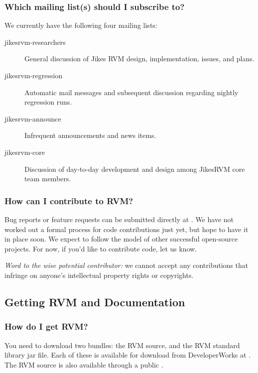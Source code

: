 \subsubsection{Which mailing list(s) should I subscribe to?}

We currently have the following four mailing lists:

\begin{description}
\item[jikesrvm-researchers]
    General discussion of Jikes RVM design, implementation, issues, and
    plans.
\item[jikesrvm-regression]
   Automatic mail messages and subsequent discussion regarding nightly
   regression runs.
\item[jikesrvm-announce]
  Infrequent announcements and news items.
\item[jikesrvm-core]
  Discussion of day-to-day development and design among JikesRVM core team
  members.
\end{description}


\subsubsection{How can I contribute to RVM?}
Bug reports or feature requests can be submitted directly at
\xlink{{\tt \RVMBugURL}}{\RVMBugURL}.  We have not worked out a formal
process for code contributions just yet, but hope to have it in place
soon.  We expect to follow the 
model of other successful open-source projects.  For now, if you'd like to
contribute code, let us know.

{\em Word to the wise potential contributor:} we cannot accept any
contributions that infringe on anyone's intellectual property rights or
copyrights.

\JavaTMFooter

\AIXTMFooter

\PowerPCTMFooter

\JikesTMFooter

\subsection{Getting RVM and Documentation}

\subsubsection{How do I get RVM?}

You need to download two bundles: the RVM source, and the RVM standard library
jar file.  Each of these is available for download from DeveloperWorks at
\xlink{{\tt \RVMDownloadURL}}{\RVMDownloadURL}.  
The RVM source is also available through a 
public 
.

